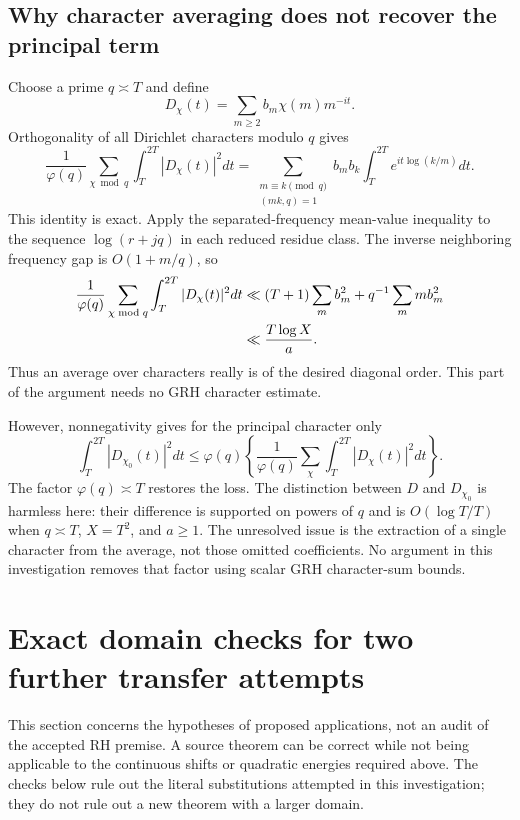 \documentclass[11pt,a4paper]{article}
\theoremstyle{definition}
\theoremstyle{remark}
\begin{document}
\subsection{Why character averaging does not recover the principal term}
\label{f-sub-character-average}

Choose a prime $q\asymp T$ and define
\[
 D_\chi(t)=\sum_{m\ge2}b_m\chi(m)m^{-it}.
\]
Orthogonality of all Dirichlet characters modulo $q$ gives
\begin{equation}
 \frac1{\varphi(q)}\sum_{\chi\bmod q}\int_T^{2T}|D_\chi(t)|^2dt
 =\sum_{\substack{m\equiv k\pmod q\\(mk,q)=1}}
 b_mb_k\int_T^{2T}e^{it\log(k/m)}dt.
 \label{f-eq-character-average}
\end{equation}
This identity is exact.  Apply the separated-frequency mean-value
inequality to the sequence $\log(r+jq)$ in each reduced residue class.
The inverse neighboring frequency gap is $O(1+m/q)$, so
\begin{align}
 \frac1{\varphi(q)}\sum_{\chi\bmod q}\int_T^{2T}|D_\chi(t)|^2dt
 &\ll(T+1)\sum_m b_m^2+q^{-1}\sum_m mb_m^2
 \notag\\
 &\ll\frac{T\log X}{a}.
 \label{f-eq-character-average-bound}
\end{align}
Thus an average over characters really is of the desired diagonal order.
This part of the argument needs no GRH character estimate.

However, nonnegativity gives for the principal character only
\[
 \int_T^{2T}|D_{\chi_0}(t)|^2dt
 \le\varphi(q)\left\{
 \frac1{\varphi(q)}\sum_\chi\int_T^{2T}|D_\chi(t)|^2dt\right\}.
\]
The factor $\varphi(q)\asymp T$ restores the loss.  The distinction between
$D$ and $D_{\chi_0}$ is harmless here: their difference is supported on
powers of $q$ and is $O(\log T/T)$ when $q\asymp T$, $X=T^2$, and
$a\ge1$.  The unresolved issue is the extraction of a single character
from the average, not those omitted coefficients.  No argument in this
investigation removes that factor using scalar GRH character-sum bounds.

\section{Exact domain checks for two further transfer attempts}
\label{f-sec-domain-checks}

This section concerns the hypotheses of proposed applications, not an audit
of the accepted RH premise.  A source theorem can be correct while not
being applicable to the continuous shifts or quadratic energies required
above.  The checks below rule out the literal substitutions attempted in
this investigation; they do not rule out a new theorem with a larger
domain.
\end{document}
